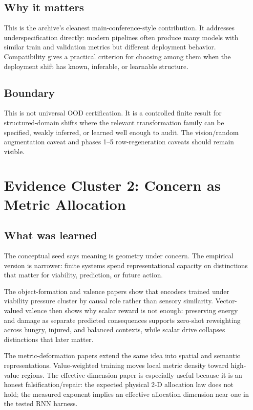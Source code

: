 \documentclass[11pt]{article}
\begin{document}
\subsection{Why it matters}

This is the archive's cleanest main-conference-style contribution. It addresses
underspecification directly: modern pipelines often produce many models with
similar train and validation metrics but different deployment behavior.
Compatibility gives a practical criterion for choosing among them when the
deployment shift has known, inferable, or learnable structure.

\subsection{Boundary}

This is not universal OOD certification. It is a controlled finite result for
structured-domain shifts where the relevant transformation family can be
specified, weakly inferred, or learned well enough to audit. The vision/random
augmentation caveat and phases 1--5 row-regeneration caveats should remain
visible.

\section{Evidence Cluster 2: Concern as Metric Allocation}

\subsection{What was learned}

The conceptual seed says meaning is geometry under concern. The empirical
version is narrower: finite systems spend representational capacity on
distinctions that matter for viability, prediction, or future action.

The object-formation and valence papers show that encoders trained under
viability pressure cluster by causal role rather than sensory similarity.
Vector-valued valence then shows why scalar reward is not enough: preserving
energy and damage as separate predicted consequences supports zero-shot
reweighting across hungry, injured, and balanced contexts, while scalar drive
collapses distinctions that later matter.

The metric-deformation papers extend the same idea into spatial and semantic
representations. Value-weighted training moves local metric density toward
high-value regions. The effective-dimension paper is especially useful because
it is an honest falsification/repair: the expected physical 2-D allocation law
does not hold; the measured exponent implies an effective allocation dimension
near one in the tested RNN harness.
\end{document}
